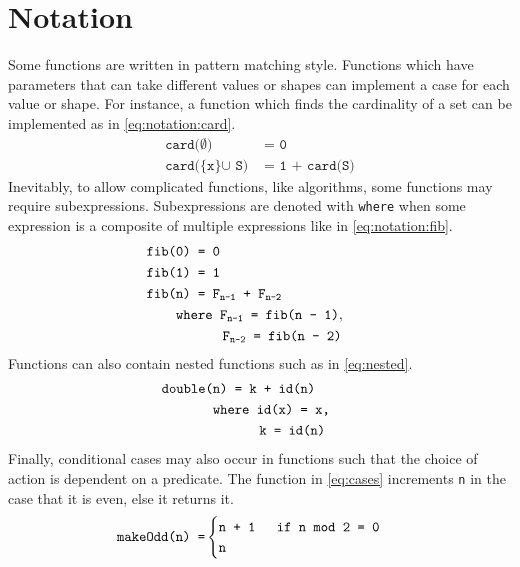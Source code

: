 \section{Notation}
Some functions are written in pattern matching style.
Functions which have parameters that can take different values or shapes can implement a case for each value or shape.
For instance, a function which finds the cardinality of a set can be implemented as in \autoref{eq:notation:card}.
\begin{align}
  \texttt{card($\emptyset$) }&\texttt{= 0} \label{eq:notation:card} \\
  \texttt{card(\{x\} $\cup$ S) }&\texttt{= 1 + card(S)} \tag*{}
\end{align}
Inevitably, to allow complicated functions, like algorithms, some functions may require subexpressions.
Subexpressions are denoted with \texttt{where} when some expression is a composite of multiple expressions like in \autoref{eq:notation:fib}.
\begin{align}
  \texttt{fib(0) }&\texttt{= 0} \label{eq:notation:fib} \\
  \texttt{fib(1) }&\texttt{= 1} \tag*{} \\
  \texttt{fib(n) }&\texttt{= F$_\texttt{n-1}$ + F$_\texttt{n-2}$} \tag*{} \\
  \texttt{whe}&\texttt{re F$_\texttt{n-1}$ = fib(n - 1)},\tag*{}\\
  &\hspace{0.62cm}\texttt{F$_\texttt{n-2}$ = fib(n - 2)}\tag*{}
\end{align}
Functions can also contain nested functions such as in \autoref{eq:nested}.
\begin{align}
  \texttt{double(n) }&\texttt{= k + id(n)} \label{eq:nested} \\
  \texttt{whe}&\texttt{re id(x) = x,} \tag*{}\\
  &\hspace{0.62cm}\texttt{k = id(n)} \tag*{}
\end{align}
Finally, conditional cases may also occur in functions such that the choice of action is dependent on a predicate.
The function in \autoref{eq:cases} increments \texttt{n} in the case that it is even, else it returns it.
\begin{align}
  \texttt{makeOdd(n) }&\texttt{=} 
  \begin{cases}
    \texttt{n + 1} & \texttt{ if n \texttt{mod} 2 = 0 }\\
    \texttt{n} & 
  \end{cases}\label{eq:cases} 
\end{align}
